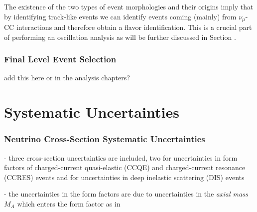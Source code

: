 
The existence of the two types of event morphologies and their origins imply that by identifying track-like events we can identify events coming (mainly) from $\nu_\mu$-CC interactions and therefore obtain a flavor identification.
This is a crucial part of performing an oscillation analysis as will be further discussed in Section .

\subsubsection{Final Level Event Selection}

add this here or in the analysis chapters?


\section{Systematic Uncertainties} 

\subsubsection{Neutrino Cross-Section Systematic Uncertainties}


- three cross-section uncertainties are included, two for uncertainties in form factors of charged-current quasi-elastic (CCQE) and charged-current resonance (CCRES) events and for uncertainties in deep inelastic scattering (DIS) events

- the uncertainties in the form factors are due to uncertainties in the \textit{axial mass} $M_A$ which enters the form factor as in 

